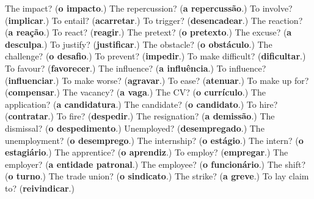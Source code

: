 \begin{tcolorbox}[breakable,colback=teal!4,colframe=teal!35!black,title={Before you move on}]
The impact? (\textbf{o impacto}.) The repercussion? (\textbf{a repercussão}.) To involve? (\textbf{implicar}.) To entail? (\textbf{acarretar}.) To trigger? (\textbf{desencadear}.) The reaction? (\textbf{a reação}.) To react? (\textbf{reagir}.) The pretext? (\textbf{o pretexto}.) The excuse? (\textbf{a desculpa}.) To justify? (\textbf{justificar}.) The obstacle? (\textbf{o obstáculo}.) The challenge? (\textbf{o desafio}.) To prevent? (\textbf{impedir}.) To make difficult? (\textbf{dificultar}.) To favour? (\textbf{favorecer}.) The influence? (\textbf{a influência}.) To influence? (\textbf{influenciar}.) To make worse? (\textbf{agravar}.) To ease? (\textbf{atenuar}.) To make up for? (\textbf{compensar}.) The vacancy? (\textbf{a vaga}.) The CV? (\textbf{o currículo}.) The application? (\textbf{a candidatura}.) The candidate? (\textbf{o candidato}.) To hire? (\textbf{contratar}.) To fire? (\textbf{despedir}.) The resignation? (\textbf{a demissão}.) The dismissal? (\textbf{o despedimento}.) Unemployed? (\textbf{desempregado}.) The unemployment? (\textbf{o desemprego}.) The internship? (\textbf{o estágio}.) The intern? (\textbf{o estagiário}.) The apprentice? (\textbf{o aprendiz}.) To employ? (\textbf{empregar}.) The employer? (\textbf{a entidade patronal}.) The employee? (\textbf{o funcionário}.) The shift? (\textbf{o turno}.) The trade union? (\textbf{o sindicato}.) The strike? (\textbf{a greve}.) To lay claim to? (\textbf{reivindicar}.)
\end{tcolorbox}
